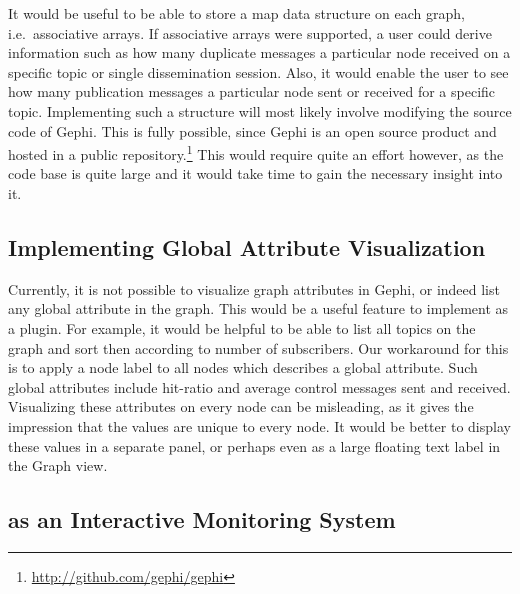 It would be useful to be able to store a map data structure on each
graph, i.e.\ associative arrays. If associative arrays were supported,
a user could derive information such as how many duplicate messages a
particular node received on a specific topic or single dissemination
session. Also, it would enable the user to see how many publication messages a
particular node sent or received for a specific topic. Implementing such
a structure will most likely involve modifying the source code of Gephi.
This is fully possible, since Gephi is an open source product and hosted
in a public repository.\footnote{\url{http://github.com/gephi/gephi}}
This would require quite an effort however, as the code base is quite
large and it would take time to gain the necessary insight into it.

\subsection{Implementing Global Attribute Visualization}

Currently, it is not possible to visualize graph attributes in Gephi, or
indeed list any global attribute in the graph. This would be a useful
feature to implement as a plugin. For example, it would be helpful to be
able to list all topics on the graph and sort then according to number
of subscribers. Our workaround for this is to apply a node label to all
nodes which describes a global attribute. Such global attributes include
hit-ratio and average control messages sent and received. Visualizing
these attributes on every node can be misleading, as it gives the
impression that the values are unique to every node. It would be better
to display these values in a separate panel, or perhaps even as a large
floating text label in the Graph view.

\subsection{\demo{} as an Interactive Monitoring System}

